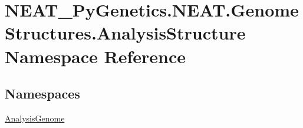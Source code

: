 \hypertarget{namespaceNEAT__PyGenetics_1_1NEAT_1_1GenomeStructures_1_1AnalysisStructure}{}\section{N\+E\+A\+T\+\_\+\+Py\+Genetics.\+N\+E\+A\+T.\+Genome\+Structures.\+Analysis\+Structure Namespace Reference}
\label{namespaceNEAT__PyGenetics_1_1NEAT_1_1GenomeStructures_1_1AnalysisStructure}
\subsection*{Namespaces}
\begin{DoxyCompactItemize}
\item 
 \hyperlink{namespaceNEAT__PyGenetics_1_1NEAT_1_1GenomeStructures_1_1AnalysisStructure_1_1AnalysisGenome}{Analysis\+Genome}
\end{DoxyCompactItemize}
